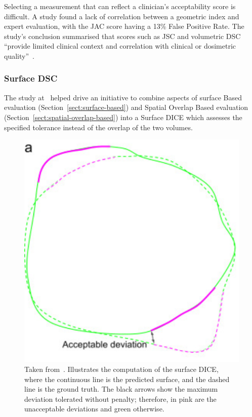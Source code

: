 \documentclass[12pt,twoside]{report}
\begin{document}
Selecting a measurement that can reflect a clinician's acceptability score is difficult. A study found a lack of correlation between a geometric index and expert evaluation, with the JAC score having a 13\% False Positive Rate. The study's conclusion summarised that scores such as JSC and volumetric DSC ``provide limited clinical context and correlation with clinical or dosimetric quality''~\cite{Sherer2021-le}.


\subsubsection{Surface DSC}\label{sect:surface-DSC}

The study at~\cite{Sherer2021-le} helped drive an initiative to combine aspects of surface Based evaluation (Section~\ref{sect:surface-based}) and Spatial Overlap Based evaluation (Section~\ref{sect:spatial-overlap-based}) into a Surface DICE which assesses the specified tolerance instead of the overlap of the two volumes.

\begin{figure}
  \centering
  \includegraphics[width=0.3\linewidth]{../figures/Surface-dice.png}
  \caption{Taken from~\cite{Nikolov2021-xe}. Illustrates the computation of the surface DICE, where the continuous line is the predicted surface, and the dashed line is the ground truth. The black arrows show the maximum deviation tolerated without penalty; therefore, in pink are the unacceptable deviations and green otherwise.}\label{fig:surface-dice}
\end{figure}
\end{document}
